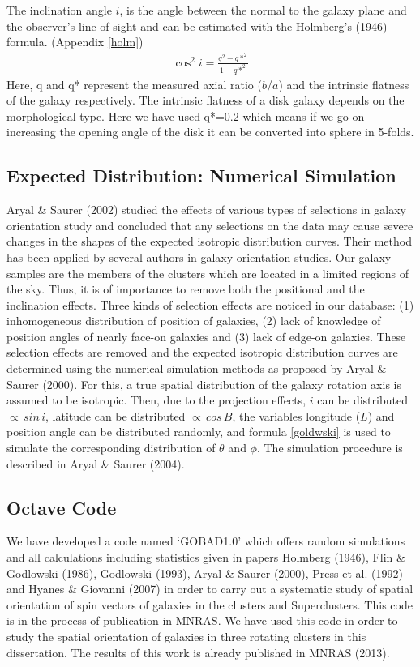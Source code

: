 The inclination angle $i$, is the angle between the normal to the
galaxy plane and the observer's line-of-sight and can be estimated
with the Holmberg's (1946) formula. (Appendix \ref{holm})
\begin{equation}
\begin{array}{l}
\cos^2 i = \frac{q^2 - q*^2}{1 - q*^2}
\end{array}
\end{equation}
Here, q and q* represent the measured axial ratio ($b$/$a$) and
the intrinsic flatness of the galaxy respectively. The intrinsic
flatness of a disk galaxy depends on the morphological type. Here we have used q*=0.2 which means if we go on increasing the opening angle of the disk it can be converted into sphere in 5-folds.
\subsection{Expected Distribution: Numerical Simulation}
Aryal \& Saurer (2002) studied the effects of various types of selections in galaxy orientation study and concluded that any selections on the data may cause severe changes in the shapes of the expected isotropic distribution curves. Their method has been applied by several authors in galaxy orientation studies. Our galaxy samples are the members of the clusters which are located in a limited regions of the sky. Thus, it is of importance to remove both the positional and the inclination effects. Three kinds of selection effects are noticed in our database: (1) inhomogeneous distribution of position of galaxies, (2) lack of knowledge of position angles of nearly face-on galaxies and (3) lack of edge-on galaxies. These selection effects are removed and the expected isotropic distribution curves are determined using the numerical simulation methods as proposed by Aryal \& Saurer (2000). For this, a true spatial distribution of the galaxy rotation axis is assumed to be isotropic. Then, due to the projection effects, $i$ can be distributed $\propto\,sin\,i$, latitude can be distributed $\propto\,cos\,B$, the variables longitude ($L$) and position angle can be distributed randomly, and formula \eqref{goldwski} is used to simulate the corresponding distribution of $\theta$ and $\phi$. The simulation procedure is described in Aryal \& Saurer (2004).

\subsection{Octave Code}
We have developed a code named `GOBAD1.0' which offers random simulations and all calculations including statistics given in papers Holmberg (1946), Flin \& Godlowski (1986), Godlowski (1993), Aryal \& Saurer (2000), Press et al. (1992) and Hyanes \& Giovanni (2007) in order to carry out a systematic study of spatial orientation of spin vectors of galaxies in the clusters and Superclusters. This code is in the process of publication in MNRAS. We have used this code in order to study the spatial orientation of galaxies in three rotating clusters in this dissertation. The results of this work is already published in MNRAS (2013).
